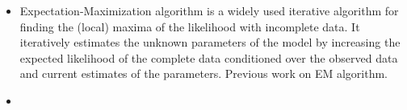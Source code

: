 \documentclass[]{report}
\theoremstyle{definition}
\begin{document}
	
\thispagestyle{empty}

\begin{itemize}
    \item Expectation-Maximization algorithm is a widely used iterative algorithm for finding the (local) maxima of the likelihood with incomplete data. It iteratively estimates the unknown parameters of the model by increasing the expected likelihood of the complete data conditioned over the observed data and current estimates of the parameters. Previous work on EM algorithm\cite{houdouin2023regularizedemalgorithm}.
    \item 
\end{itemize}



    
\end{document}
